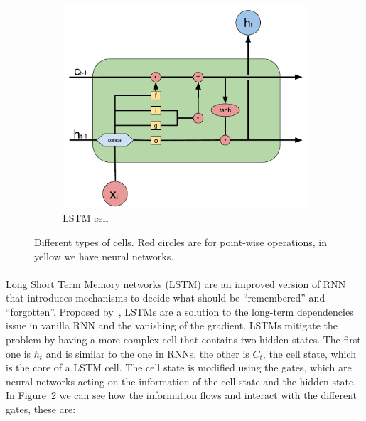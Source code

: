 \begin{figure}[]
\begin{subfigure}[t]{0.5\textwidth}
    \end{subfigure}%
    ~ 
    \begin{subfigure}[t]{0.5\textwidth}
        \centering
        \includegraphics[width=\textwidth]{images/LSTM_cell_simple.pdf}
        \caption{LSTM cell}
        \label{subfig:lstm_cell}

    \end{subfigure}
    \caption{Different types of cells. Red circles are for point-wise operations, in yellow we have neural networks.} %
    \label{fig:cells}
\end{figure} 

\paragraph{}
Long Short Term Memory networks (LSTM) are an improved version of RNN  that introduces mechanisms to decide what should be ``remembered'' and ``forgotten''. Proposed by~\cite{hochreiter1997long}, LSTMs are a solution to the long-term dependencies issue in vanilla RNN and the vanishing of the gradient. LSTMs mitigate the problem by having a more complex cell that contains two hidden states. The first one is $h_t$ and is similar to the one in RNNs, the other is $C_t$, the cell state, which is the core of a LSTM cell. The cell state is modified using the gates, which are neural networks acting on the information of the cell state and the hidden state. In Figure~\ref{fig:cells} we can see how the information flows and interact with the different gates, these are:

